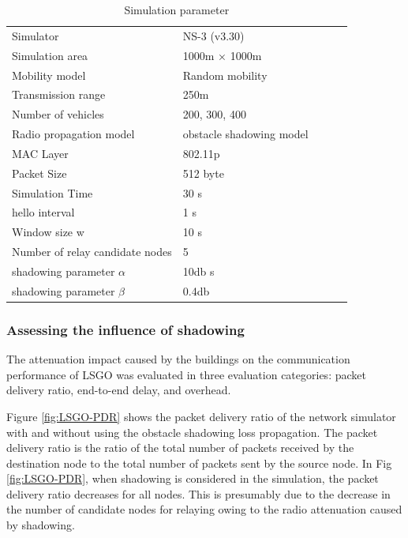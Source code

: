 \documentclass[conference]{IEEEtran}
\begin{document}
\begin{table}[!ht]
\begin{center}
\caption{Simulation parameter}
\label{tab:parameter}
\begin{tabular}{|l|l|lll}
\cline{1-2}
Simulator    & NS-3 (v3.30) &  &  &  \\ \cline{1-2}
Simulation area    & 1000m × 1000m   &  &  &  \\ \cline{1-2}
Mobility model     & Random mobility &  &  &  \\ \cline{1-2}
Transmission range & 250m            &  &  &  \\ \cline{1-2}
Number of vehicles & 200, 300, 400      &  &  &  \\ \cline{1-2}
Radio propagation model    & obstacle shadowing model\cite{20}&  &  &  \\ \cline{1-2}
MAC Layer     & 802.11p &  &  &  \\ \cline{1-2}
Packet Size & 512 byte       &  &  &  \\ \cline{1-2}
Simulation Time & 30 s      &  &  &  \\ \cline{1-2}
hello interval & 1 s      &  &  &  \\ \cline{1-2}
Window size w  & 10 s      &  &  &  \\ \cline{1-2}
Number of relay candidate nodes  & 5       &  &  \\ \cline{1-2}
shadowing parameter $\alpha$  & 10db s      &  &  &  \\ \cline{1-2}
shadowing parameter $\beta$    & 0.4db &  &  \\ \cline{1-2}
\end{tabular}
\end{center}
\end{table}


\subsubsection{Assessing the influence of shadowing}
The attenuation impact caused by the buildings on the communication performance of LSGO was evaluated in three evaluation categories: packet delivery ratio, end-to-end delay, and overhead.  

Figure \ref{fig:LSGO-PDR} shows the packet delivery ratio of the network simulator with and without using the obstacle shadowing loss propagation. 
The packet delivery ratio is the ratio of the total number of packets received by the destination node to the total number of packets sent by the source node.
In Fig \ref{fig:LSGO-PDR}, when shadowing is considered in the simulation, the packet delivery ratio decreases for all nodes. This is presumably due to the decrease in the number of candidate nodes for relaying owing to the radio attenuation caused by shadowing.
\end{document}
